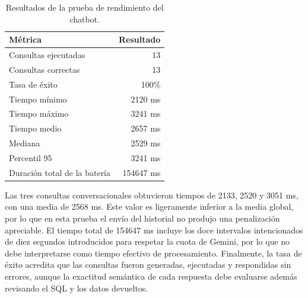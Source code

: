 \begin{table}[H]
    \centering
    \begin{tabular}{|l|r|}
        \hline
        \textbf{Métrica} & \textbf{Resultado} \\ \hline
        Consultas ejecutadas & 13 \\ \hline
        Consultas correctas & 13 \\ \hline
        Tasa de éxito & 100\% \\ \hline
        Tiempo mínimo & 2120 ms \\ \hline
        Tiempo máximo & 3241 ms \\ \hline
        Tiempo medio & 2657 ms \\ \hline
        Mediana & 2529 ms \\ \hline
        Percentil 95 & 3241 ms \\ \hline
        Duración total de la batería & 154647 ms \\ \hline
    \end{tabular}
    \caption{Resultados de la prueba de rendimiento del chatbot.}
    \label{tab:rendimiento_chatbot}
\end{table}

Las tres consultas conversacionales obtuvieron tiempos de 2133, 2520 y 3051 ms, con una media de 2568 ms. Este valor es ligeramente inferior a la media global, por lo que en esta prueba el envío del historial no produjo una penalización apreciable. El tiempo total de 154647 ms incluye los doce intervalos intencionados de diez segundos introducidos para respetar la cuota de Gemini, por lo que no debe interpretarse como tiempo efectivo de procesamiento. Finalmente, la tasa de éxito acredita que las consultas fueron generadas, ejecutadas y respondidas sin errores, aunque la exactitud semántica de cada respuesta debe evaluarse además revisando el SQL y los datos devueltos.




